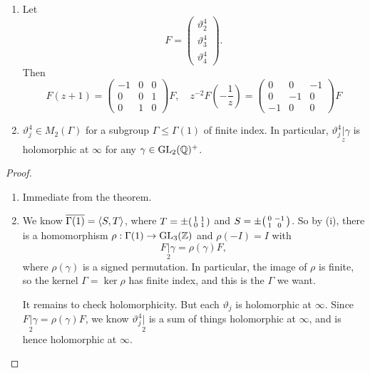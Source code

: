 \documentclass[a4paper]{article}
\begin{document}
\begin{cor}\leavevmode
  \begin{enumerate}
    \item Let
      \[
        F =
        \begin{pmatrix}
          \vartheta_2^4\\
          \vartheta_3^4\\
          \vartheta_4^4
        \end{pmatrix}.
      \]
      Then
      \[
        F(z + 1) =
        \begin{pmatrix}
           -1 & 0 & 0\\
           0 & 0 & 1\\
           0 & 1 & 0
         \end{pmatrix} F,\quad z^{-2} F\left(-\frac{1}{z}\right) =
         \begin{pmatrix}
           0 & 0 & -1\\
           0 & -1 & 0\\
           -1 & 0 & 0
         \end{pmatrix}F
      \]
    \item $\vartheta_j^4 \in M_2(\Gamma)$ for a subgroup $\Gamma \leq \Gamma(1)$ of finite index. In particular, $\vartheta_j^4 \underset{z}{|} \gamma$ is holomorphic at $\infty$ for any $\gamma \in \mathrm{GL}_2(\mathbb{Q})^+$.
  \end{enumerate}
\end{cor}
\begin{proof}\leavevmode
  \begin{enumerate}
    \item Immediate from the theorem.
    \item We know $\overline{\Gamma(1)} = \langle S, T\rangle$, where $T = \pm \begin{psmallmatrix}1 & 1\\0 & 1\end{psmallmatrix}$ and $S = \pm \begin{psmallmatrix}0 & -1\\1 & 0\end{psmallmatrix}$. So by (i), there is a homomorphism $\rho: \Gamma(1) \to \mathrm{GL}_3(\mathbb{Z})$ and $\rho(-I) = I$ with
      \[
        F\underset{2}{|} \gamma = \rho(\gamma) F,
      \]
      where $\rho(\gamma)$ is a signed permutation. In particular, the image of $\rho$ is finite, so the kernel $\Gamma = \ker \rho$ has finite index, and this is the $\Gamma$ we want.

      It remains to check holomorphicity. But each $\vartheta_j$ is holomorphic at $\infty$. Since $F\underset{2}{|} \gamma= \rho (\gamma) F$, we know $\vartheta_j^4\underset{2}{|}$ is a sum of things holomorphic at $\infty$, and is hence holomorphic at $\infty$.\qedhere
  \end{enumerate}
\end{proof}
\end{document}
